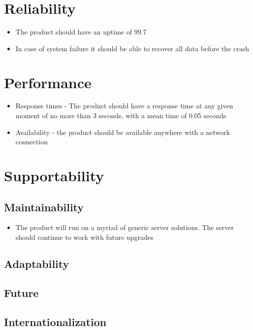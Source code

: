 \documentclass[10pt]{article}
\begin{document}
\section{Reliability}
\begin{itemize}
\item The product should have an uptime of 99.7%
\item In case of system failure it should be able to recover all data before the crash
\end{itemize}

\section{Performance}
\begin{itemize}
\item Response times - The product should have a response time at any given moment of no more than 3 seconds, with a mean time of 0.05 seconds
\item Availability - the product should be available anywhere with a network connection
\end{itemize}

\section{Supportability}

\subsection{Maintainability}

\begin{itemize}

\item The product will run on a myriad of generic server solutions. The server should continue to work with future upgrades 
\end{itemize}
\subsection{Adaptability}
\subsection{Future} 

\subsection{Internationalization}
\end{document}

